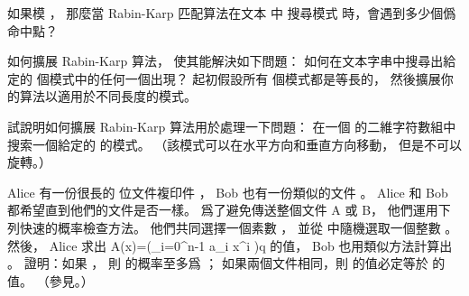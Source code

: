 \startsection[
  title={The Rabin-Karp algorithm},
]

\startEXERCISE
如果模 ，
那麼當 Rabin-Karp 匹配算法在文本  中
搜尋模式  時，會遇到多少個僞命中點？
\stopEXERCISE

\startANSWER
{}
\stopANSWER

\startEXERCISE
如何擴展 Rabin-Karp 算法，
使其能解決如下問題：
如何在文本字串中搜尋出給定的  個模式中的任何一個出現？
起初假設所有  個模式都是等長的，
然後擴展你的算法以適用於不同長度的模式。
\stopEXERCISE

\startANSWER
{}
\stopANSWER

\startEXERCISE
試說明如何擴展 Rabin-Karp 算法用於處理一下問題：
在一個  的二維字符數組中搜索一個給定的  的模式。
（該模式可以在水平方向和垂直方向移動，
但是不可以旋轉。）
\stopEXERCISE

\startANSWER
{}
\stopANSWER

\startEXERCISE
Alice 有一份很長的  位文件複印件 ，
 Bob 也有一份類似的文件 。
 Alice 和 Bob 都希望直到他們的文件是否一樣。
爲了避免傳送整個文件 A 或 B，
他們運用下列快速的概率檢查方法。
他們共同選擇一個素數 ，
並從  中隨機選取一個整數 。
然後， Alice 求出
\startformula
A(x)=\left(\sum_{i=0}^{n-1} a_i x^i \right)\mod q
\stopformula
的值， Bob 也用類似方法計算出 。
證明：如果 ，
則  的概率至多爲 ；
如果兩個文件相同，則  的值必定等於  的值。
（\hint 參見。）
\stopEXERCISE

\startANSWER
{}
\stopANSWER

\stopsection
